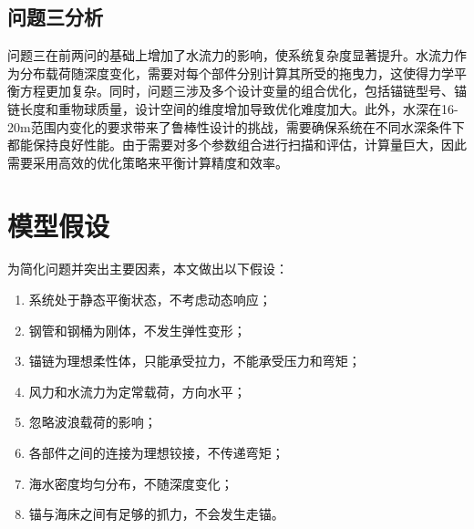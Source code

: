 \documentclass[withoutpreface,bwprint]{cumcmthesis}
\begin{document}
\subsection{问题三分析}
问题三在前两问的基础上增加了水流力的影响，使系统复杂度显著提升。水流力作为分布载荷随深度变化，需要对每个部件分别计算其所受的拖曳力，这使得力学平衡方程更加复杂。同时，问题三涉及多个设计变量的组合优化，包括锚链型号、锚链长度和重物球质量，设计空间的维度增加导致优化难度加大。此外，水深在16-20m范围内变化的要求带来了鲁棒性设计的挑战，需要确保系统在不同水深条件下都能保持良好性能。由于需要对多个参数组合进行扫描和评估，计算量巨大，因此需要采用高效的优化策略来平衡计算精度和效率。


\section{模型假设}

为简化问题并突出主要因素，本文做出以下假设：

\begin{enumerate}
\item 系统处于静态平衡状态，不考虑动态响应；
\item 钢管和钢桶为刚体，不发生弹性变形；
\item 锚链为理想柔性体，只能承受拉力，不能承受压力和弯矩；
\item 风力和水流力为定常载荷，方向水平；
\item 忽略波浪载荷的影响；
\item 各部件之间的连接为理想铰接，不传递弯矩；
\item 海水密度均匀分布，不随深度变化；
\item 锚与海床之间有足够的抓力，不会发生走锚。
\end{enumerate}

\end{document}
